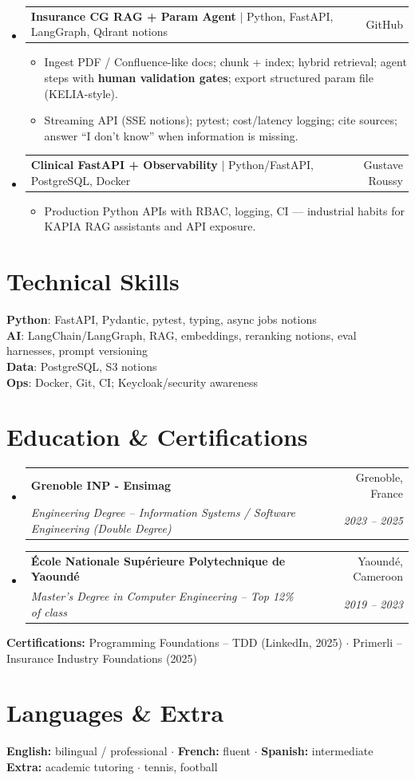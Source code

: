 \documentclass[letterpaper,10.5pt]{article}
\makeatletter
\newcommand{\resumeItem}[1]{\item\small{#1 \vspace{-1.5pt}}}
\newcommand{\resumeSubheading}[4]{
  \vspace{-1pt}\item
    \begin{tabular*}{0.97\textwidth}[t]{l@{\extracolsep{\fill}}r}
      \textbf{#1} & #2 \\
      \textit{\small#3} & \textit{\small #4} \\
    \end{tabular*}\vspace{-5pt}
}
\newcommand{\resumeProjectHeading}[2]{
    \item
    \begin{tabular*}{0.97\textwidth}{l@{\extracolsep{\fill}}r}
      \small#1 & #2 \\
    \end{tabular*}\vspace{-5pt}
}
\newcommand{\resumeSubHeadingListStart}{\begin{itemize}[leftmargin=0.15in, label={}]}
\newcommand{\resumeSubHeadingListEnd}{\end{itemize}}
\newcommand{\resumeItemListStart}{\begin{itemize}[leftmargin=0.18in]}
\newcommand{\resumeItemListEnd}{\end{itemize}\vspace{-3pt}}
\makeatother
\begin{document}
\resumeSubHeadingListStart
  \resumeProjectHeading
    {\textbf{Insurance CG RAG + Param Agent} $|$ Python, FastAPI, LangGraph, Qdrant notions}{GitHub}
    \resumeItemListStart
      \resumeItem{Ingest PDF / Confluence-like docs; chunk + index; hybrid retrieval; agent steps with \textbf{human validation gates}; export structured param file (KELIA-style).}
      \resumeItem{Streaming API (SSE notions); pytest; cost/latency logging; cite sources; answer ``I don't know'' when information is missing.}
    \resumeItemListEnd
  \resumeProjectHeading
    {\textbf{Clinical FastAPI + Observability} $|$ Python/FastAPI, PostgreSQL, Docker}{Gustave Roussy}
    \resumeItemListStart
      \resumeItem{Production Python APIs with RBAC, logging, CI --- industrial habits for KAPIA RAG assistants and API exposure.}
    \resumeItemListEnd
\resumeSubHeadingListEnd

\section{Technical Skills}

\begin{itemize}[leftmargin=0.15in, label={}]
  \small{\item{
\textbf{Python}: FastAPI, Pydantic, pytest, typing, async jobs notions \\
\textbf{AI}: LangChain/LangGraph, RAG, embeddings, reranking notions, eval harnesses, prompt versioning \\
\textbf{Data}: PostgreSQL, S3 notions \\
\textbf{Ops}: Docker, Git, CI; Keycloak/security awareness
  }}
\end{itemize}

\section{Education \& Certifications}

\resumeSubHeadingListStart
  \resumeSubheading
    {Grenoble INP - Ensimag}{Grenoble, France}
    {Engineering Degree -- Information Systems / Software Engineering (Double Degree)}{2023 -- 2025}
  \resumeSubheading
    {\'Ecole Nationale Sup\'erieure Polytechnique de Yaound\'e}{Yaound\'e, Cameroon}
    {Master's Degree in Computer Engineering -- Top 12\% of class}{2019 -- 2023}
\resumeSubHeadingListEnd
\small{
\textbf{Certifications:} Programming Foundations -- TDD (LinkedIn, 2025) $\cdot$ Primerli -- Insurance Industry Foundations (2025)
}

\section{Languages \& Extra}
\small{
\textbf{English:} bilingual / professional $\cdot$ \textbf{French:} fluent $\cdot$ \textbf{Spanish:} intermediate \\
\textbf{Extra:} academic tutoring $\cdot$ tennis, football
}
\end{document}
